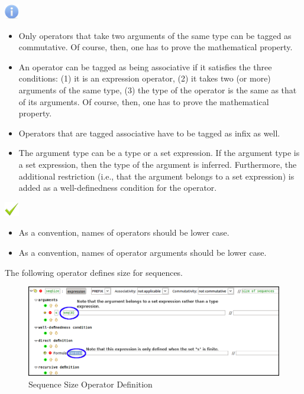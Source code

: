 \includegraphics{images/info.png} 
\begin{itemize}
	\item Only operators that take two arguments of the same type can be tagged as commutative. Of course, then, one has to prove the mathematical property.
	\item An operator can be tagged as being associative if it satisfies the three conditions: (1) it is an expression operator, (2) it takes two (or more) arguments of the same type, (3) the type of the operator is the same as that of its arguments. Of course, then, one has to prove the mathematical property.
	\item Operators that are tagged associative have to be tagged as infix as well.
	\item The argument type can be a type or a set expression. If the argument type is a set expression, then the type of the argument is inferred. Furthermore, the additional restriction (i.e., that the argument belongs to a set expression) is added as a well-definedness condition for the operator.
\end{itemize}

\includegraphics{images/nike.png} 
\begin{itemize}
	\item As a convention, names of operators should be lower case.
	\item As a convention, names of operator arguments should be lower case.
\end{itemize}

\par 
The following operator defines size for sequences.

\begin{center}
\begin{figure}
\label{seqOP}
\includegraphics{images/SeqSize.png}
\caption{Sequence Size Operator Definition}
\end{figure}
\end{center}

